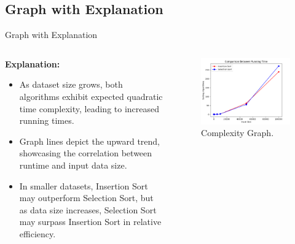 \documentclass{beamer}
\begin{document}
\subsection{Graph with Explanation}
\begin{frame}{Graph with Explanation}
  \begin{columns}
    \begin{column}{0.6\textwidth}
      \textbf{Explanation:}
      \begin{itemize}
        \item As dataset size grows, both algorithms exhibit expected quadratic time complexity, leading to increased running times.
        \item Graph lines depict the upward trend, showcasing the correlation between runtime and input data size.
        \item In smaller datasets, Insertion Sort may outperform Selection Sort, but as data size increases, Selection Sort may surpass Insertion Sort in relative efficiency.
      \end{itemize}
    \end{column}
    \begin{column}{0.5\textwidth}
      \begin{figure}
        \centering
        \includegraphics[width=\textwidth]{table1.png} %
        \caption{Complexity Graph.}
      \end{figure}
    \end{column}
  \end{columns}
\end{frame}
\end{document}
